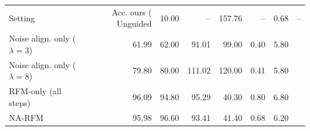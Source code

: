 \begin{tabular}{lrrrrrr}
\toprule
Setting & Acc. ours (%
\midrule
Unguided & 10.00 & -- & 157.76 & -- & 0.68 & -- \\
Noise align. only ($\lambda=3$) & 61.99 & 62.00 & 91.01 & 99.00 & 0.40 & 5.80 \\
Noise align. only ($\lambda=8$) & 79.80 & 80.00 & 111.02 & 120.00 & 0.41 & 5.80 \\
RFM-only (all steps) & 96.09 & 94.80 & 95.29 & 40.30 & 0.80 & 6.80 \\
NA-RFM & 95.98 & 96.60 & 93.41 & 41.40 & 0.68 & 6.20 \\
\bottomrule
\end{tabular}
